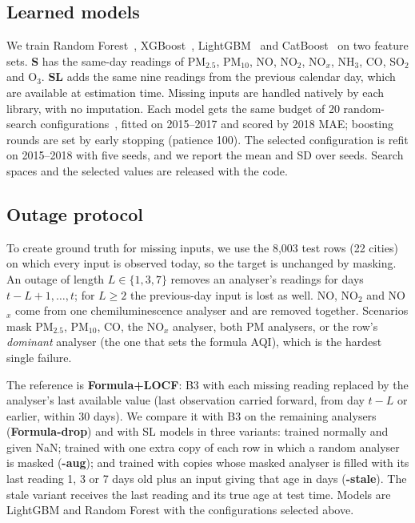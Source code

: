 \documentclass[conference]{IEEEtran}
\begin{document}
\subsection{Learned models}
We train Random Forest~\cite{breiman2001}, XGBoost~\cite{chen2016xgboost},
LightGBM~\cite{ke2017lightgbm} and CatBoost~\cite{prokhorenkova2018catboost} on two feature
sets. \textbf{S} has the same-day readings of PM$_{2.5}$, PM$_{10}$, NO, NO$_2$, NO$_x$, NH$_3$,
CO, SO$_2$ and O$_3$. \textbf{SL} adds the same nine readings from the previous calendar day,
which are available at estimation time. Missing inputs are handled natively by each library,
with no imputation. Each model gets the same budget of 20 random-search
configurations~\cite{bergstra2012random}, fitted on 2015--2017 and scored by 2018 MAE; boosting
rounds are set by early stopping (patience 100). The selected configuration is refit on
2015--2018 with five seeds, and we report the mean and SD over seeds. Search spaces and the
selected values are released with the code.

\subsection{Outage protocol}\label{sec:protocol}
To create ground truth for missing inputs, we use the 8,003 test rows (22 cities) on which every
input is observed today, so the target is unchanged by masking. An outage of length
$L\in\{1,3,7\}$ removes an analyser's readings for days $t-L+1,\dots,t$; for $L\ge2$ the
previous-day input is lost as well. NO, NO$_2$ and NO$_x$ come from one chemiluminescence
analyser and are removed together. Scenarios mask PM$_{2.5}$, PM$_{10}$, CO, the NO$_x$
analyser, both PM analysers, or the row's \emph{dominant} analyser (the one that sets the
formula AQI), which is the hardest single failure.

The reference is \textbf{Formula+LOCF}: B3 with each missing reading replaced by the
analyser's last available value (last observation carried forward, from day $t-L$ or earlier,
within 30 days). We compare it with B3 on the remaining analysers (\textbf{Formula-drop}) and
with SL models in three variants: trained normally and given NaN; trained with one extra copy
of each row in which a random analyser is masked (\textbf{-aug}); and trained with copies whose
masked analyser is filled with its last reading 1, 3 or 7 days old plus an input giving that
age in days (\textbf{-stale}). The stale variant receives the last reading and its true age at
test time. Models are LightGBM and Random Forest with the configurations selected above.
\end{document}
